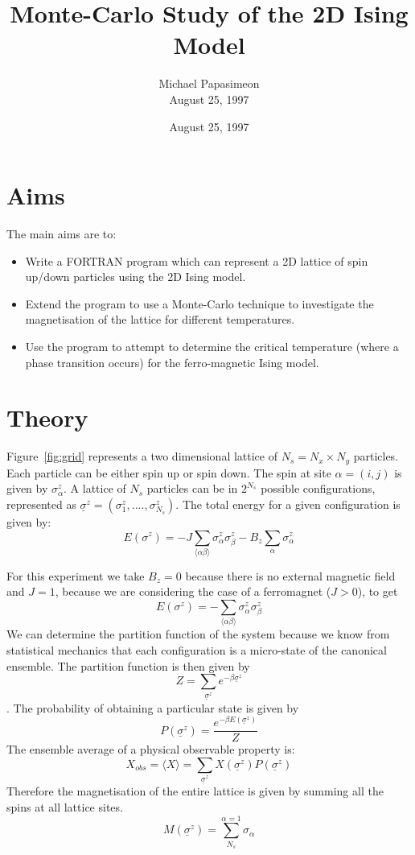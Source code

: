 \documentclass[a4paper]{IEEEtran}
\title{Monte-Carlo Study of the 2D Ising Model}
\author{Michael Papasimeon\\ August 25, 1997}
\date{August 25, 1997}
\newcommand{\sz}{\underline{\sigma}^z}
\begin{document}
\maketitle


\begin{abstract}
\end{abstract}

\section{Aims}
The main aims are to:
\begin{itemize}
    \item Write a FORTRAN program which can represent 
          a 2D lattice of spin up/down particles using the 2D Ising model.
    \item Extend the program to use a Monte-Carlo technique to investigate
          the magnetisation of the lattice for different temperatures.
    \item Use the program to attempt to determine the critical temperature
          (where a phase transition occurs) for the ferro-magnetic Ising 
          model.
\end{itemize}


\section{Theory}
    Figure~\ref{fig:grid} represents a two dimensional lattice of 
    $N_s = N_x \times N_y$ particles. Each particle can be either 
    spin up or spin down. The spin at site $\alpha = (i,j)$
    is given by $\sigma^{z}_{\alpha}$. 
    A lattice of $N_s$ particles can be in $2^{N_s}$ possible configurations,
    represented as $\sz = ( \sigma^z_1,...., \sigma^z_{N_s} )$.
    The total energy for a given configuration is given by:
    \[ E(\sigma^z) = -J \sum_{\langle \alpha \beta \rangle} 
                        \sigma_{\alpha}^{z} \sigma_{\beta}^{z}
                   -B_z \sum_{\alpha } \sigma_{\alpha}^{z} \]

    For this experiment we take $B_z = 0$ because there is no
    external magnetic field and $J = 1$, because we are considering
    the case of a ferromagnet ($J > 0$), to get
    \[ E(\sigma^z) = -\sum_{\langle \alpha \beta \rangle} 
                      \sigma_{\alpha}^{z} \sigma_{\beta}^{z} \]
    We can determine the partition function of the system because we know
    from statistical mechanics that each configuration is a micro-state of
    the canonical ensemble. The partition function is then given by
    \[ Z = \sum_{\sz } e^{-\beta \sz } \] .
    The probability of obtaining a particular state is given by
    \[ P(\sz) = \frac{e^{-\beta E(\sz) }}{Z} \]
    The ensemble average of a physical observable property is:
    \[ X_{obs} = \langle X \rangle = \sum_{\sz} X(\sz) P(\sz) \]
    Therefore the magnetisation of the entire lattice is given
    by summing all the spins at all lattice sites.
    \[ M(\sz) = \sum_{N_s}^{\alpha = 1} \sigma_{\alpha} \]
\end{document}
